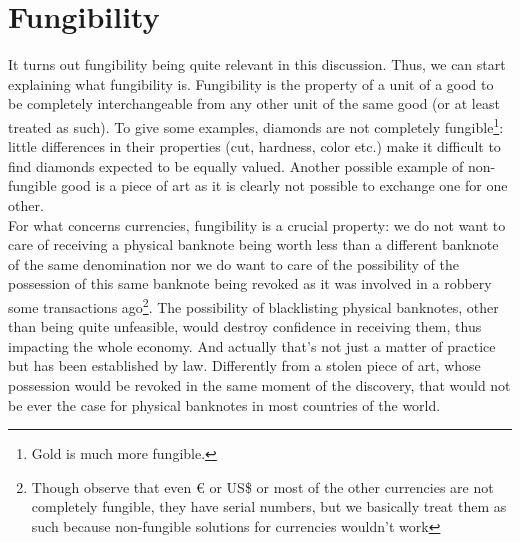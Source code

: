 \section{Fungibility}
It turns out fungibility being quite relevant in this discussion. Thus, we can start explaining what fungibility is. Fungibility is the property of a unit of a good to be completely interchangeable from any other unit of the same good (or at least treated as such). To give some examples, diamonds are not completely fungible\footnote{Gold is much more fungible.}: little differences in their properties (cut, hardness, color etc.) make it difficult to find diamonds expected to be equally valued. Another possible example of non-fungible good is a piece of art as it is clearly not possible to exchange one for one other.\\
For what concerns currencies, fungibility is a crucial property: we do not want to care of receiving a physical banknote being worth less than a different banknote of the same denomination nor we do want to care of the possibility of the possession of this same banknote being revoked as it was involved in a robbery some transactions ago\footnote{Though observe that even \euro{} or US\$ or most of the other currencies are not completely fungible, they have serial numbers, but we basically treat them as such because non-fungible solutions for currencies wouldn't work}. The possibility of blacklisting physical banknotes, other than being quite unfeasible, would destroy confidence in receiving them, thus impacting the whole economy. And actually that's not just a matter of practice but has been established by law. Differently from a stolen piece of art, whose possession would be revoked in the same moment of the discovery, that would not be ever the case for physical banknotes in most countries of the world.
